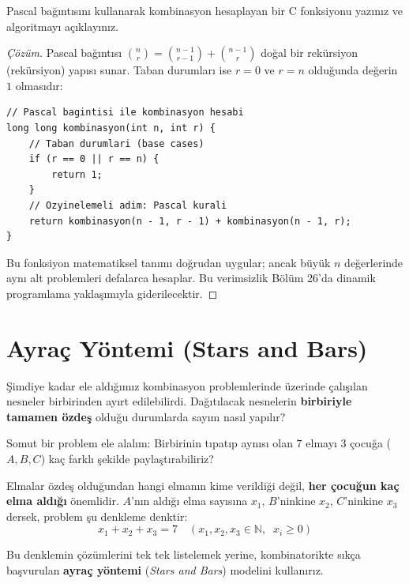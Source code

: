 \begin{example}
Pascal bağıntısını kullanarak kombinasyon hesaplayan bir C fonksiyonu yazınız ve algoritmayı açıklayınız.
\end{example}
\begin{proof}[Çözüm]
Pascal bağıntısı $\binom{n}{r} = \binom{n-1}{r-1} + \binom{n-1}{r}$ doğal bir rekürsiyon (rekürsiyon) yapısı sunar. Taban durumları ise $r = 0$ ve $r = n$ olduğunda değerin $1$ olmasıdır:

\begin{lstlisting}[language=CTemel]
// Pascal bagintisi ile kombinasyon hesabi
long long kombinasyon(int n, int r) {
    // Taban durumlari (base cases)
    if (r == 0 || r == n) {
        return 1;
    }
    // Ozyinelemeli adim: Pascal kurali
    return kombinasyon(n - 1, r - 1) + kombinasyon(n - 1, r);
}
\end{lstlisting}

Bu fonksiyon matematiksel tanımı doğrudan uygular; ancak büyük $n$ değerlerinde aynı alt problemleri defalarca hesaplar. Bu verimsizlik Bölüm 26'da dinamik programlama yaklaşımıyla giderilecektir.
\end{proof}


\section{Ayraç Yöntemi (Stars and Bars)}

Şimdiye kadar ele aldığımız kombinasyon problemlerinde üzerinde çalışılan nesneler birbirinden ayırt edilebilirdi. Dağıtılacak nesnelerin \textbf{birbiriyle tamamen özdeş} olduğu durumlarda sayım nasıl yapılır?

Somut bir problem ele alalım: Birbirinin tıpatıp aynısı olan $7$ elmayı $3$ çocuğa ($A, B, C$) kaç farklı şekilde paylaştırabiliriz?

Elmalar özdeş olduğundan hangi elmanın kime verildiği değil, \textbf{her çocuğun kaç elma aldığı} önemlidir.
$A$'nın aldığı elma sayısına $x_1$, $B$'ninkine $x_2$, $C$'ninkine $x_3$ dersek, problem şu denkleme denktir:
\[ x_1 + x_2 + x_3 = 7 \quad (x_1, x_2, x_3 \in \mathbb{N}, \;\; x_i \ge 0) \]

Bu denklemin çözümlerini tek tek listelemek yerine, kombinatorikte sıkça başvurulan \textbf{ayraç yöntemi} (\textit{Stars and Bars}) modelini kullanırız.

